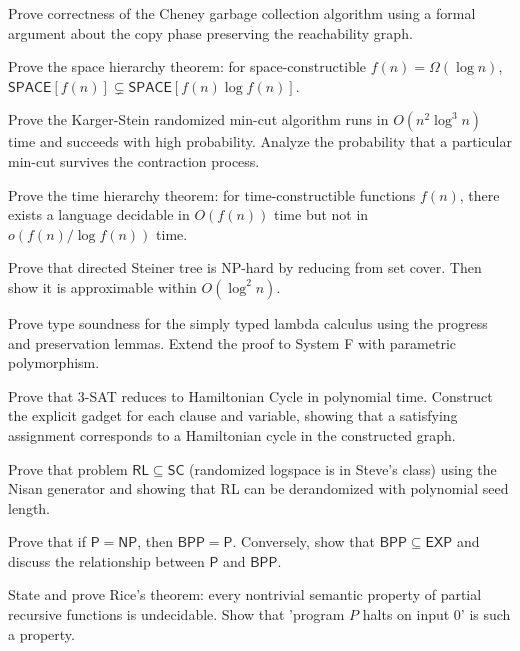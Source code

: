 \documentclass[12pt,a4paper]{exam}
\begin{document}
\begin{questions}
\question[3]
Prove correctness of the Cheney garbage collection algorithm using a formal argument about the copy phase preserving the reachability graph.

\vspace{0.3cm}

\question[6]
Prove the space hierarchy theorem: for space-constructible $f(n) = \Omega(\log n)$, $\mathsf{SPACE}[f(n)] \subsetneq \mathsf{SPACE}[f(n) \log f(n)]$.

\vspace{0.3cm}

\question[4]
Prove the Karger-Stein randomized min-cut algorithm runs in $O(n^2 \log^3 n)$ time and succeeds with high probability. Analyze the probability that a particular min-cut survives the contraction process.

\vspace{0.3cm}

\question[4]
Prove the time hierarchy theorem: for time-constructible functions $f(n)$, there exists a language decidable in $O(f(n))$ time but not in $o(f(n)/\log f(n))$ time.

\vspace{0.3cm}

\question[3]
Prove that directed Steiner tree is NP-hard by reducing from set cover. Then show it is approximable within $O(\log^2 n)$.

\vspace{0.3cm}

\question[4]
Prove type soundness for the simply typed lambda calculus using the progress and preservation lemmas. Extend the proof to System F with parametric polymorphism.

\vspace{0.3cm}

\question[5]
Prove that 3-SAT reduces to Hamiltonian Cycle in polynomial time. Construct the explicit gadget for each clause and variable, showing that a satisfying assignment corresponds to a Hamiltonian cycle in the constructed graph.

\vspace{0.3cm}

\question[3]
Prove that problem $\mathsf{RL} \subseteq \mathsf{SC}$ (randomized logspace is in Steve's class) using the Nisan generator and showing that RL can be derandomized with polynomial seed length.

\vspace{0.3cm}

\question[4]
Prove that if $\mathsf{P} = \mathsf{NP}$, then $\mathsf{BPP} = \mathsf{P}$. Conversely, show that $\mathsf{BPP} \subseteq \mathsf{EXP}$ and discuss the relationship between $\mathsf{P}$ and $\mathsf{BPP}$.

\vspace{0.3cm}

\question[2]
State and prove Rice's theorem: every nontrivial semantic property of partial recursive functions is undecidable. Show that 'program $P$ halts on input 0' is such a property.

\vspace{0.3cm}

\end{questions}
\end{document}
